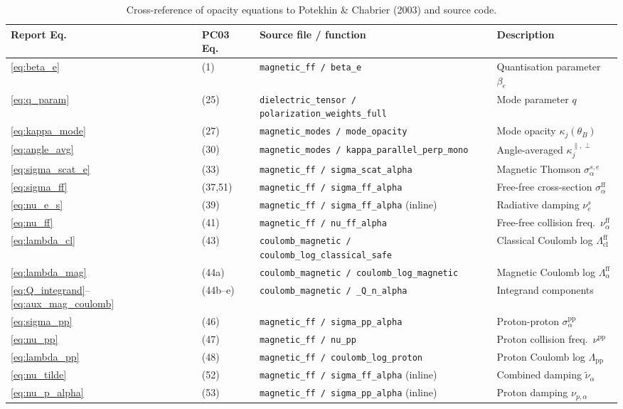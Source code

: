 \begin{table}[ht]
\centering
\caption{Cross-reference of opacity equations to Potekhin \& Chabrier
(2003) and source code.}
\label{tab:opacity_xref}
\small
\begin{tabular}{lllp{5.5cm}}
\hline
Report Eq. & PC03 Eq. & Source file / function & Description \\
\hline
\eqref{eq:beta_e}           & (1)     & \texttt{magnetic\_ff / beta\_e} &
  Quantisation parameter $\beta_e$ \\
\eqref{eq:q_param}          & (25)    & \texttt{dielectric\_tensor / polarization\_weights\_full} &
  Mode parameter $q$ \\
\eqref{eq:kappa_mode}        & (27)    & \texttt{magnetic\_modes / mode\_opacity} &
  Mode opacity $\kappa_j(\theta_B)$ \\
\eqref{eq:angle_avg}        & (30)    & \texttt{magnetic\_modes / kappa\_parallel\_perp\_mono} &
  Angle-averaged $\kappa_j^{\parallel,\perp}$ \\
\eqref{eq:sigma_scat_e}     & (33)    & \texttt{magnetic\_ff / sigma\_scat\_alpha} &
  Magnetic Thomson $\sigma_\alpha^{s,e}$ \\
\eqref{eq:sigma_ff}         & (37,51) & \texttt{magnetic\_ff / sigma\_ff\_alpha} &
  Free-free cross-section $\sigma_\alpha^{\mathrm{ff}}$ \\
\eqref{eq:nu_e_s}           & (39)    & \texttt{magnetic\_ff / sigma\_ff\_alpha} (inline) &
  Radiative damping $\nu_e^s$ \\
\eqref{eq:nu_ff}            & (41)    & \texttt{magnetic\_ff / nu\_ff\_alpha} &
  Free-free collision freq.\ $\nu_\alpha^{\mathrm{ff}}$ \\
\eqref{eq:lambda_cl}        & (43)    & \texttt{coulomb\_magnetic / coulomb\_log\_classical\_safe} &
  Classical Coulomb log $\Lambda_{\mathrm{cl}}^{\mathrm{ff}}$ \\
\eqref{eq:lambda_mag}       & (44a)   & \texttt{coulomb\_magnetic / coulomb\_log\_magnetic} &
  Magnetic Coulomb log $\Lambda_\alpha^{\mathrm{ff}}$ \\
\eqref{eq:Q_integrand}--\eqref{eq:aux_mag_coulomb}
                             & (44b--e)& \texttt{coulomb\_magnetic / \_Q\_n\_alpha} &
  Integrand components \\
\eqref{eq:sigma_pp}         & (46)    & \texttt{magnetic\_ff / sigma\_pp\_alpha} &
  Proton-proton $\sigma_\alpha^{\mathrm{pp}}$ \\
\eqref{eq:nu_pp}            & (47)    & \texttt{magnetic\_ff / nu\_pp} &
  Proton collision freq.\ $\nu^{\mathrm{pp}}$ \\
\eqref{eq:lambda_pp}        & (48)    & \texttt{magnetic\_ff / coulomb\_log\_proton} &
  Proton Coulomb log $\Lambda_{\mathrm{pp}}$ \\
\eqref{eq:nu_tilde}         & (52)    & \texttt{magnetic\_ff / sigma\_ff\_alpha} (inline) &
  Combined damping $\tilde\nu_\alpha$ \\
\eqref{eq:nu_p_alpha}       & (53)    & \texttt{magnetic\_ff / sigma\_pp\_alpha} (inline) &
  Proton damping $\nu_{p,\alpha}$ \\
\hline
\end{tabular}
\end{table}


